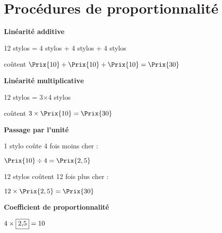 \section{Procédures de proportionnalité}
\begin{center} 
    \begin{Mind}
        \begin{Bulle}[Nom={HautGauche},Pointilles,Ancre={-6,1.9},Largeur=7cm,CFond=blue!15]
            \begin{center}
                \textbf{Linéarité additive}
                
                12 stylos = 4 stylos + 4 stylos + 4 stylos 
                
                coûtent $\Prix{10}+\Prix{10}+\Prix{10} =\Prix{30}$
            \end{center}
        \end{Bulle}
        \begin{Bulle}[Nom={HautDroit},Pointilles,Ancre={2,1.9},Largeur=7cm,CFond=blue!15]
            \begin{center}
                \textbf{Linéarité multiplicative}

                12 stylos = 3$\times$4 stylos 
                
                coûtent $3\times\Prix{10} =\Prix{30}$
            \end{center}
        \end{Bulle}
        \begin{Bulle}[Nom={BasGauche},Pointilles,Ancre={-6,-2.2},Largeur=7cm,CFond=blue!15]
            \begin{center}
                \textbf{Passage par l'unité}

                1 stylo coûte 4 fois moins cher : 
                
                $\Prix{10}\div4 =\Prix{2,5}$ 
                
                12 stylos coûtent 12 fois plus cher : 
                
                $12\times\Prix{2,5} =\Prix{30}$
            \end{center}
        \end{Bulle}
        \begin{Bulle}[Nom={BasDroit},Pointilles,Ancre={2,-2.2},Largeur=7cm,CFond=blue!15]
            \begin{center}
                \textbf{Coefficient de proportionnalité}

                $4\times\fbox{2,5} =10$ 
                

\end{center}
\end{Bulle}
\end{Mind}
\end{center}
